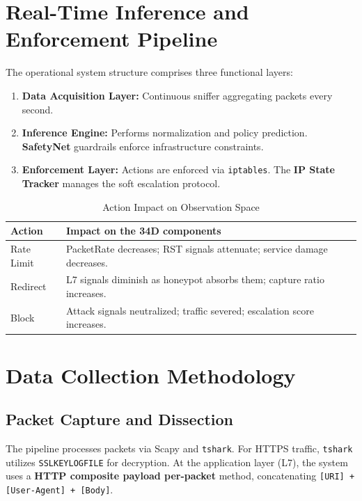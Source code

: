 \documentclass[12pt,a4paper]{report}
\begin{document}
\section{Real-Time Inference and Enforcement Pipeline}

The operational system structure comprises three functional layers:
\begin{enumerate}
    \item \textbf{Data Acquisition Layer:} Continuous sniffer aggregating packets every second.
    \item \textbf{Inference Engine:} Performs normalization and policy prediction. \textbf{SafetyNet} guardrails enforce infrastructure constraints.
    \item \textbf{Enforcement Layer:} Actions are enforced via \texttt{iptables}. The \textbf{IP State Tracker} manages the soft escalation protocol.
\end{enumerate}

\begin{table}[htbp]
\centering
\caption{Action Impact on Observation Space}
\label{tab:action_impact}
\begin{tabular}{L{2.5cm} L{12cm}}
\toprule
\textbf{Action} & \textbf{Impact on the 34D components} \\
\midrule
Rate Limit & PacketRate decreases; RST signals attenuate; service damage decreases. \\
Redirect & L7 signals diminish as honeypot absorbs them; capture ratio increases. \\
Block & Attack signals neutralized; traffic severed; escalation score increases. \\
\bottomrule
\end{tabular}
\end{table}

\section{Data Collection Methodology}

\subsection{Packet Capture and Dissection}

The pipeline processes packets via Scapy and \texttt{tshark}. For HTTPS traffic, \texttt{tshark} utilizes \texttt{SSLKEYLOGFILE} for decryption. At the application layer (L7), the system uses a \textbf{HTTP composite payload per-packet} method, concatenating \texttt{[URI] + [User-Agent] + [Body]}.
\end{document}
